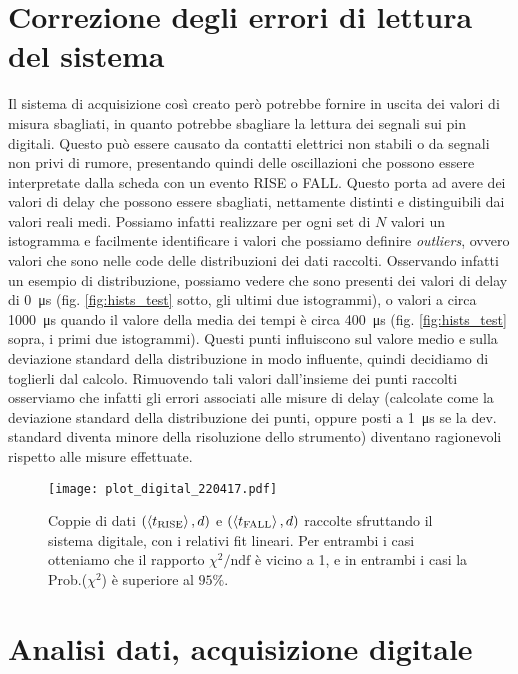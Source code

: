 \documentclass[
    rmp,
    reprint, 
    superscriptaddress, 
    altaffilletter, 
    amsmath, 
    amssymb, 
    a4paper,
    varvw]{revtex4-2}
\begin{document}
\section{Correzione degli errori di lettura del sistema}\label{sec:error_stat}
Il sistema di acquisizione così creato però potrebbe fornire in uscita dei valori di misura sbagliati, in quanto potrebbe sbagliare la lettura dei segnali sui pin digitali. Questo può essere causato da contatti elettrici non stabili o da segnali non privi di rumore, presentando quindi delle oscillazioni che possono essere interpretate dalla scheda con un evento RISE o FALL. Questo porta ad avere dei valori di delay che possono essere sbagliati, nettamente distinti e distinguibili dai valori reali medi. Possiamo infatti realizzare per ogni set di $N$ valori un istogramma e facilmente identificare i valori che possiamo definire \emph{outliers}, ovvero valori che sono nelle code delle distribuzioni dei dati raccolti. Osservando infatti un esempio di distribuzione, possiamo vedere che sono presenti dei valori di delay di \SI{0}{\micro\second} (fig. \ref{fig:hists_test} sotto, gli ultimi due istogrammi), o valori a circa \SI{1000}{\micro\second} quando il valore della media dei tempi è circa \SI{400}{\micro\second} (fig. \ref{fig:hists_test} sopra, i primi due istogrammi).
Questi punti influiscono sul valore medio e sulla deviazione standard della distribuzione in modo influente, quindi decidiamo di toglierli dal calcolo. Rimuovendo tali valori dall'insieme dei punti raccolti osserviamo che infatti gli errori associati alle misure di delay (calcolate come la deviazione standard della distribuzione dei punti, oppure posti a \SI{1}{\micro\second} se la dev. standard diventa minore della risoluzione dello strumento) diventano ragionevoli rispetto alle misure effettuate. 

\begin{figure}[!t]
    \centering
    \texttt{[image: plot\_digital\_220417.pdf]}
    \caption{Coppie di dati $(\expval{t_\text{RISE}}, d)$ e $(\expval{t_\text{FALL}}, d)$ raccolte sfruttando il sistema digitale, con i relativi fit lineari. Per entrambi i casi otteniamo che il rapporto $\chi^2/\text{ndf}$ è vicino a 1, e in entrambi i casi la Prob.($\chi^2$) è superiore al $95\%$.}\label{fig:digital_plot_d2}
\end{figure}

\section{Analisi dati, acquisizione digitale}
\end{document}
